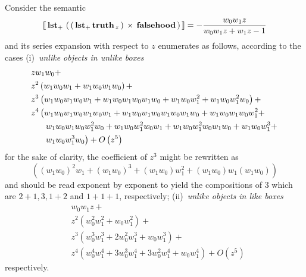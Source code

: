\begin{example}
Consider the semantic
\begin{displaymath}
    \left\llbracket\,\textbf{lst}_{+}\,\left(\,\left(\,\textbf{lst}_{+}\,{\textbf{truth}}_{\,z}\,\right)\,\times\,\textbf{falsehood}\,\right)\,\right\rrbracket = - \frac{w_{0} w_{1} z}{w_{0} w_{1} z + w_{1} z - 1}
\end{displaymath}
and its series expansion with respect to $z$ enumerates as follows,
according to the cases (i)~\textit{unlike objects in unlike boxes}
\begin{displaymath}
\begin{split}
&z w_{1} w_{0} + \\
&z^{2} \left(w_{1} w_{0} w_{1} + w_{1} w_{0} w_{1} w_{0}\right) + \\
&z^{3} \left(w_{1} w_{0} w_{1} w_{0} w_{1} + w_{1} w_{0} w_{1} w_{0} w_{1} w_{0} + w_{1} w_{0} w_{1}^{2} + w_{1} w_{0} w_{1}^{2} w_{0}\right) + \\
&z^{4} \left(w_{1} w_{0} w_{1} w_{0} w_{1} w_{0} w_{1} + w_{1} w_{0} w_{1} w_{0} w_{1} w_{0} w_{1} w_{0} + w_{1} w_{0} w_{1} w_{0} w_{1}^{2} +\right.\\
&\indent\left. w_{1} w_{0} w_{1} w_{0} w_{1}^{2} w_{0} + w_{1} w_{0} w_{1}^{2} w_{0} w_{1} + w_{1} w_{0} w_{1}^{2} w_{0} w_{1} w_{0} + w_{1} w_{0} w_{1}^{3} + \right.\\
&\indent\left.w_{1} w_{0} w_{1}^{3} w_{0}\right) + O\left(z^{5}\right)
\end{split}
\end{displaymath}
for the sake of clarity, the coefficient of $z^{3}$ might be rewritten as
    $$\left((w_{1} w_{0})^{2} w_{1} + (w_{1} w_{0})^{3} + (w_{1} w_{0})
    w_{1}^{2} + (w_{1} w_{0}) w_{1} (w_{1} w_{0})\right)$$ and should be read
    exponent by exponent to yield the compositions of $3$
    which are $2+1, 3, 1+2$ and $1+1+1$, respectively;
(ii)~\textit{unlike objects in like boxes}
\begin{displaymath}
\begin{split}
&w_{0} w_{1} z +\\
&z^{2} \left(w_{0}^{2} w_{1}^{2} + w_{0} w_{1}^{2}\right) + \\
&z^{3} \left(w_{0}^{3} w_{1}^{3} + 2 w_{0}^{2} w_{1}^{3} + w_{0} w_{1}^{3}\right) + \\
&z^{4} \left(w_{0}^{4} w_{1}^{4} + 3 w_{0}^{3} w_{1}^{4} + 3 w_{0}^{2} w_{1}^{4} + w_{0} w_{1}^{4}\right) + O\left(z^{5}\right)
\end{split}
\end{displaymath}
respectively.
\end{example}

